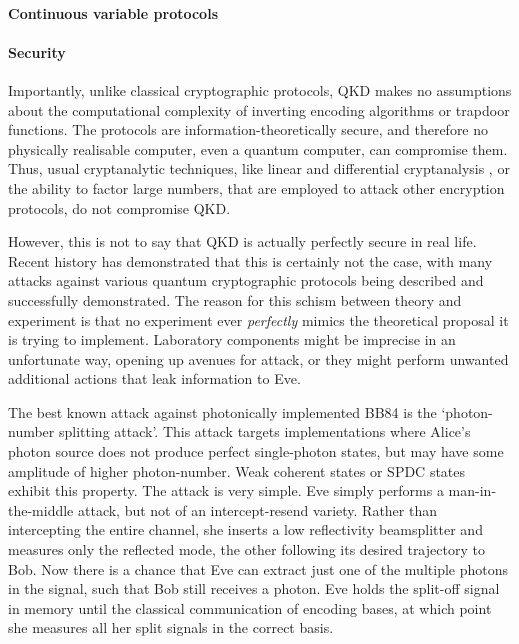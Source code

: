 \paragraph{Continuous variable protocols}


%
%

\paragraph{Security}

Importantly, unlike classical cryptographic protocols, QKD makes no assumptions about the computational complexity of inverting encoding algorithms or trapdoor functions. The protocols are information-theoretically secure, and therefore no physically realisable computer, even a quantum computer, can compromise them. Thus, usual cryptanalytic techniques, like linear and differential cryptanalysis \cite{bib:Schneier96}, or the ability to factor large numbers, that are employed to attack other encryption protocols, do not compromise QKD.

However, this is not to say that QKD is actually perfectly secure in real life. Recent history has demonstrated that this is certainly not the case, with many attacks against various quantum cryptographic protocols being described and successfully demonstrated. The reason for this schism between theory and experiment is that no experiment ever \textit{perfectly} mimics the theoretical proposal it is trying to implement. Laboratory components might be imprecise in an unfortunate way, opening up avenues for attack, or they might perform unwanted additional actions that leak information to Eve.

The best known attack against photonically implemented BB84 is the `photon-number splitting attack'. This attack targets implementations where Alice's photon source does not produce perfect single-photon states, but may have some amplitude of higher photon-number. Weak coherent states or SPDC states exhibit this property. The attack is very simple. Eve simply performs a man-in-the-middle attack, but not of an intercept-resend variety. Rather than intercepting the entire channel, she inserts a low reflectivity beamsplitter and measures only the reflected mode, the other following its desired trajectory to Bob. Now there is a chance that Eve can extract just one of the multiple photons in the signal, such that Bob still receives a photon. Eve holds the split-off signal in memory until the classical communication of encoding bases, at which point she measures all her split signals in the correct basis.

